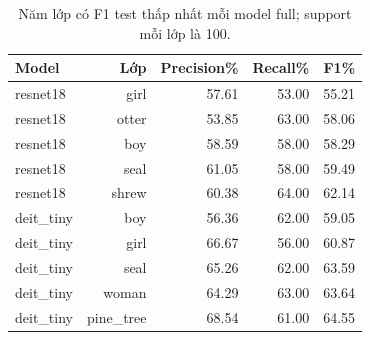 \begin{table}[htbp]
\centering\small
\caption{Năm lớp có F1 test thấp nhất mỗi model full; support mỗi lớp là 100.}\label{tab:A1classes}
\begin{lrbox}{\reporttable}\begin{tabular}{lrrrr}
\toprule
Model & Lớp & Precision\% & Recall\% & F1\% \\
\midrule
resnet18 & girl & 57.61 & 53.00 & 55.21 \\
resnet18 & otter & 53.85 & 63.00 & 58.06 \\
resnet18 & boy & 58.59 & 58.00 & 58.29 \\
resnet18 & seal & 61.05 & 58.00 & 59.49 \\
resnet18 & shrew & 60.38 & 64.00 & 62.14 \\
deit\_tiny & boy & 56.36 & 62.00 & 59.05 \\
deit\_tiny & girl & 66.67 & 56.00 & 60.87 \\
deit\_tiny & seal & 65.26 & 62.00 & 63.59 \\
deit\_tiny & woman & 64.29 & 63.00 & 63.64 \\
deit\_tiny & pine\_tree & 68.54 & 61.00 & 64.55 \\
\bottomrule
\end{tabular}\end{lrbox}
\ifdim\wd\reporttable>\linewidth\resizebox{\linewidth}{!}{\usebox{\reporttable}}\else\usebox{\reporttable}\fi
\end{table}
